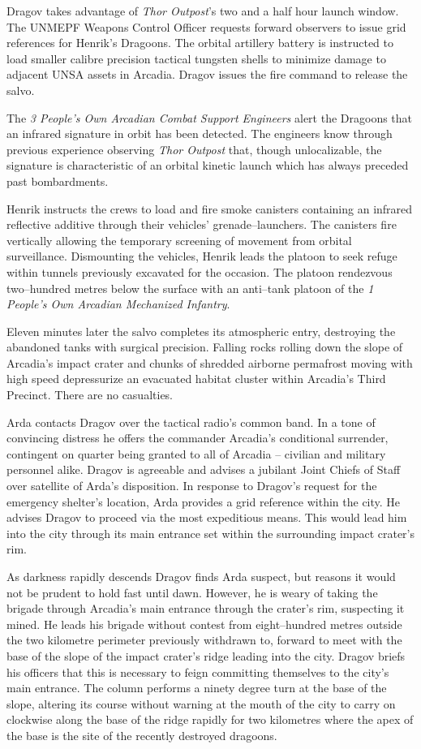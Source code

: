 Dragov takes advantage of {\it Thor Outpost}'s two and a half hour launch window. The UNMEPF Weapons Control Officer requests forward observers to issue grid references for Henrik's Dragoons. The orbital artillery battery is instructed to load smaller calibre precision tactical tungsten shells to minimize damage to adjacent UNSA assets in Arcadia. Dragov issues the fire command to release the salvo.

The {\it 3 People's Own Arcadian Combat Support Engineers} alert the Dragoons that an infrared signature in orbit has been detected. The engineers know through previous experience observing {\it Thor Outpost} that, though unlocalizable, the signature is characteristic of an orbital kinetic launch which has always preceded past bombardments.

Henrik instructs the crews to load and fire smoke canisters containing an infrared reflective additive through their vehicles' grenade--launchers. The canisters fire vertically allowing the temporary screening of movement from orbital surveillance. Dismounting the vehicles, Henrik leads the platoon to seek refuge within tunnels previously excavated for the occasion. The platoon rendezvous two--hundred metres below the surface with an anti--tank platoon of the {\it 1 People's Own Arcadian Mechanized Infantry}.

Eleven minutes later the salvo completes its atmospheric entry, destroying the abandoned tanks with surgical precision. Falling rocks rolling down the slope of Arcadia's impact crater and chunks of shredded airborne permafrost moving with high speed depressurize an evacuated habitat cluster within Arcadia's Third Precinct. There are no casualties.

Arda contacts Dragov over the tactical radio's common band. In a tone of convincing distress he offers the commander Arcadia's conditional surrender, contingent on quarter being granted to all of Arcadia -- civilian and military personnel alike. Dragov is agreeable and advises a jubilant Joint Chiefs of Staff over satellite of Arda's disposition. In response to Dragov's request for the emergency shelter's location, Arda provides a grid reference within the city. He advises Dragov to proceed via the most expeditious means. This would lead him into the city through its main entrance set within the surrounding impact crater's rim.

As darkness rapidly descends Dragov finds Arda suspect, but reasons it would not be prudent to hold fast until dawn. However, he is weary of taking the brigade through Arcadia's main entrance through the crater's rim, suspecting it mined. He leads his brigade without contest from eight--hundred metres outside the two kilometre perimeter previously withdrawn to, forward to meet with the base of the slope of the impact crater's ridge leading into the city. Dragov briefs his officers that this is necessary to feign committing themselves to the city's main entrance. The column performs a ninety degree turn at the base of the slope, altering its course without warning at the mouth of the city to carry on clockwise along the base of the ridge rapidly for two kilometres where the apex of the base is the site of the recently destroyed dragoons.

